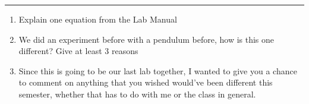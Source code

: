 \documentclass[11pt]{article}
\begin{document}
\Large

\medskip\hrule\bigskip\bigskip
{}
\begin{enumerate}

\item Explain one equation from the Lab Manual
  \vspace*{0.27\textheight}
\item We did an experiment before with a pendulum before, how is this one different? Give at least 3 reasons
  \vspace*{0.27\textheight}
\item Since this is going to be our last lab together, I wanted to give you a chance to comment on anything that you wished would've been different this semester, whether that has to do with me or the class in general. 
  
\end{enumerate}
\end{document}
